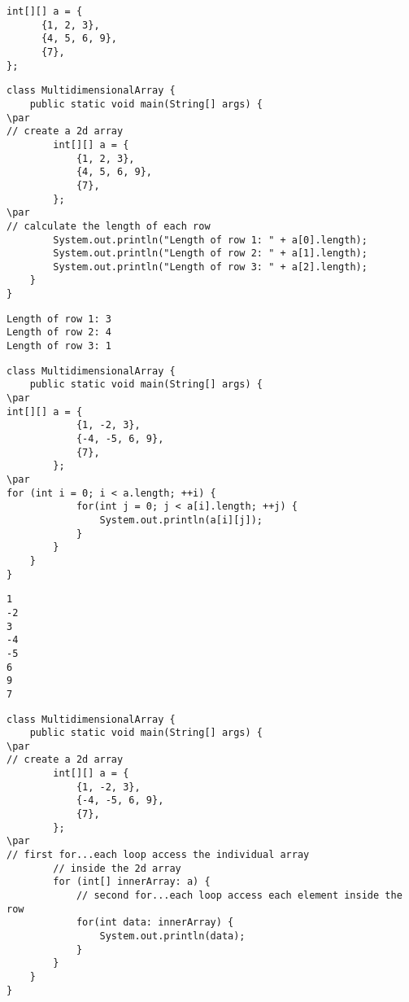 \documentclass{book}
\def\lthtmlcheckvsize{\ifdim\ht\sizebox<\vsize 
  \ifdim\wd\sizebox<\hsize\expandafter\hfill\fi \expandafter\vfill
  \else\expandafter\vss\fi}%
\begin{document}
{\newpage\clearpage
{}%
\begin{lstlisting}
int[][] a = {
      {1, 2, 3}, 
      {4, 5, 6, 9}, 
      {7}, 
};
\end{lstlisting}%
\lthtmlfigureZ
\lthtmlcheckvsize\clearpage}

{\newpage\clearpage
{}%
\begin{lstlisting}
class MultidimensionalArray {
    public static void main(String[] args) {
\par
// create a 2d array
        int[][] a = {
            {1, 2, 3}, 
            {4, 5, 6, 9}, 
            {7}, 
        };
\par
// calculate the length of each row
        System.out.println("Length of row 1: " + a[0].length);
        System.out.println("Length of row 2: " + a[1].length);
        System.out.println("Length of row 3: " + a[2].length);
    }
}
\end{lstlisting}%
\lthtmlfigureZ
\lthtmlcheckvsize\clearpage}

{\newpage\clearpage
{}%
\begin{lstlisting}
Length of row 1: 3
Length of row 2: 4
Length of row 3: 1
\end{lstlisting}%
\lthtmlfigureZ
\lthtmlcheckvsize\clearpage}

{\newpage\clearpage
{}%
\begin{lstlisting}
class MultidimensionalArray {
    public static void main(String[] args) {
\par
int[][] a = {
            {1, -2, 3}, 
            {-4, -5, 6, 9}, 
            {7}, 
        };
\par
for (int i = 0; i < a.length; ++i) {
            for(int j = 0; j < a[i].length; ++j) {
                System.out.println(a[i][j]);
            }
        }
    }
}
\end{lstlisting}%
\lthtmlfigureZ
\lthtmlcheckvsize\clearpage}

{\newpage\clearpage
{}%
\begin{lstlisting}
1
-2
3
-4
-5
6
9
7
\end{lstlisting}%
\lthtmlfigureZ
\lthtmlcheckvsize\clearpage}

{\newpage\clearpage
{}%
\begin{lstlisting}
class MultidimensionalArray {
    public static void main(String[] args) {
\par
// create a 2d array
        int[][] a = {
            {1, -2, 3}, 
            {-4, -5, 6, 9}, 
            {7}, 
        };
\par
// first for...each loop access the individual array
        // inside the 2d array
        for (int[] innerArray: a) {
            // second for...each loop access each element inside the row
            for(int data: innerArray) {
                System.out.println(data);
            }
        }
    }
}
\end{lstlisting}%
\lthtmlfigureZ
\lthtmlcheckvsize\clearpage}
\end{document}
